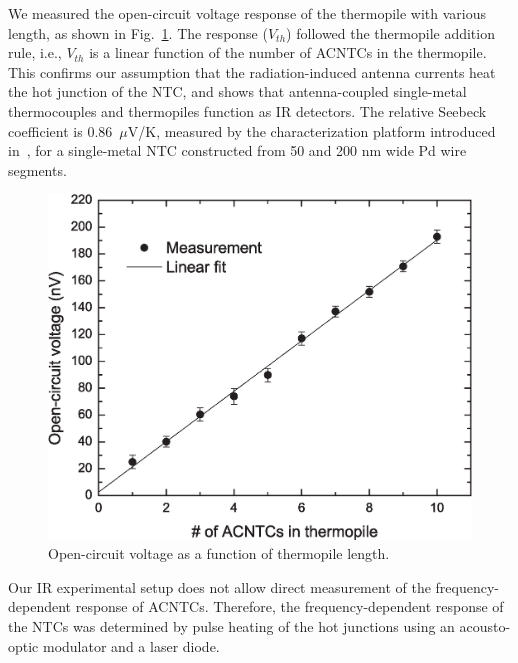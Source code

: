 \documentclass[journal]{IEEEtran}
\begin{document}
We measured the open-circuit voltage response of the thermopile with various length, as shown in Fig.~\ref{fig2}. The response ($V_{th}$) followed the thermopile addition rule, i.e., $V_{th}$ is a linear function of the number of ACNTCs in the thermopile. This confirms our assumption that the radiation-induced antenna currents heat the hot junction of the NTC, and shows that antenna-coupled single-metal thermocouples and thermopiles function as IR detectors. The relative Seebeck coefficient is 0.86~$\mu$V/K, measured by the characterization platform introduced in~\cite{szakmany_nanowire_2013}, for a single-metal NTC constructed from 50 and 200 nm wide Pd wire segments.
%
\begin{figure}[h]
\centerline{\includegraphics[width=0.95\columnwidth,clip]{figures/Fig10new}}
\caption{Open-circuit voltage as a function of thermopile length.}
\label{fig2}
\end{figure}
%

Our IR experimental setup does not allow direct measurement of the frequency-dependent response of ACNTCs. Therefore, the frequency-dependent response of the NTCs was determined by pulse heating of the hot junctions using an acousto-optic modulator and a laser diode. 
\end{document}

